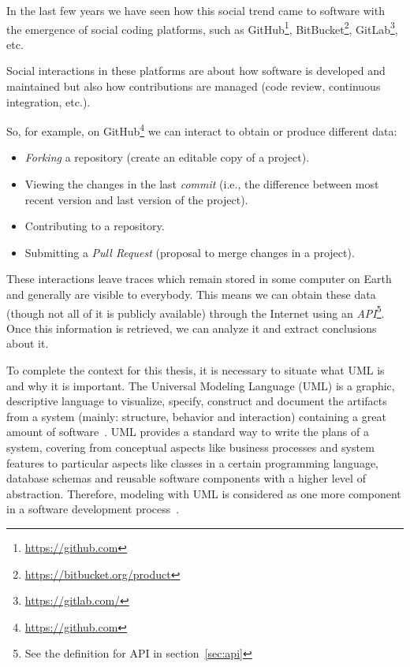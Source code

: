 \documentclass[a4paper, 12pt]{book}
\begin{document}
In the last few years we have seen how this social trend came to software with the
emergence of social coding platforms, such as GitHub\footnote{\url{https://github.com}},
BitBucket\footnote{\url{https://bitbucket.org/product}}, GitLab\footnote{\url{https://gitlab.com/}}, etc.

Social interactions in these platforms are about how software is developed and maintained but also how
contributions are managed (code review, continuous integration, etc.).

So, for example, on GitHub\footnote{\url{https://github.com}} we can interact to obtain or produce different data:
\begin{itemize}
    \item \textit{Forking} a repository (create an editable copy of a project).
    \item Viewing the changes in the last \textit{commit} (i.e., the difference between most recent version and last version of the project).
    \item Contributing to a repository.
    \item Submitting a \textit{Pull Request} (proposal to merge changes in a project).
\end{itemize}

These interactions leave traces which remain stored in some computer on Earth and generally are visible to everybody.
This means we can obtain these data (though not all of it is publicly available) through the Internet using an
\emph{API}\footnote{See the definition for API in section~\ref{sec:api}}.
Once this information is retrieved, we can analyze it and extract conclusions about it.

To complete the context for this thesis, it is necessary to situate what UML is and why it is important.
The Universal Modeling Language (UML) is a graphic, descriptive language to visualize, specify, construct and document the
artifacts from a system (mainly: structure, behavior and interaction) containing a great amount of software~\cite{rumbaugh2004unified}.
UML provides a standard way to write the plans of a system, covering from conceptual aspects like business processes and
system features to particular aspects like classes in a certain programming language, database schemas and reusable
software components with a higher level of abstraction. Therefore, modeling with UML is considered as one more component
in a software development process~\cite{chaudron2012effective}.
\end{document}
